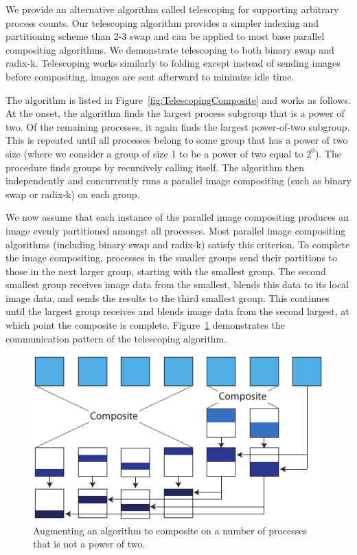\documentclass{sig-alternate}
\begin{document}
We provide an alternative algorithm called telescoping for supporting
arbitrary process counts.  Our telescoping algorithm provides a simpler
indexing and partitioning scheme than 2-3 swap and can be applied to most
base parallel compositing algorithms.  We demonstrate telescoping to both
binary swap and radix-k.  Telescoping works similarly to folding except
instead of sending images before compositing, images are sent afterward to
minimize idle time.

The  algorithm is listed in
Figure~\ref{fig:TelescopingComposite} and works as follows.  At the onset,
the algorithm finds the largest process subgroup that is a power of two.
Of the remaining processes, it again finds the largest power-of-two
subgroup.  This is repeated until all processes belong to some group that
has a power of two size (where we consider a group of size 1 to be a power
of two equal to $2^0$).  The  procedure finds
groups by recursively calling itself.  The algorithm then independently and
concurrently runs a parallel image compositing (such as binary swap or
radix-k) on each group.

We now assume that each instance of the parallel image compositing produces
an image evenly partitioned amongst all processes.  Most parallel image
compositing algorithms (including binary swap and radix-k) satisfy this
criterion.  To complete the image compositing, processes in the smaller
groups send their partitions to those in the next larger group, starting
with the smallest group.  The second smallest group receives image data
from the smallest, blends this data to its local image data, and sends the
results to the third smallest group.  This continues until the largest
group receives and blends image data from the second largest, at which
point the composite is complete.  Figure~\ref{fig:TelescopeDiagram}
demonstrates the communication pattern of the telescoping algorithm.

\begin{figure}[htbp]
  \centering
  \includegraphics[scale=.9]{images/TelescopeDiagram}
  \caption{Augmenting an algorithm to composite on a number of processes
    that is not a power of two.}
  \label{fig:TelescopeDiagram}
\end{figure}
\end{document}
